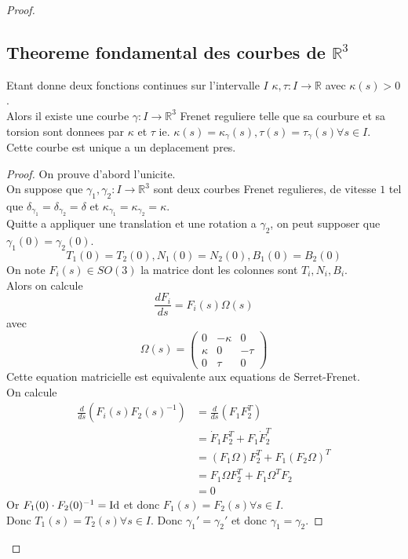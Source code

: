 \documentclass[../main.tex]{subfiles}
\begin{document}
\begin{proof}
\subsection{Theoreme fondamental des courbes de $ \mathbb{R}^{3}$ }
Etant donne deux fonctions continues sur l'intervalle $I$ $\kappa,\tau: I \to \mathbb{R}$ avec $\kappa( s) >0$.\\
Alors il existe une courbe $\gamma: I \to \mathbb{R}^{3}$ Frenet reguliere telle que sa courbure et sa torsion sont donnees par $\kappa$ et $\tau$ ie. $\kappa( s) = \kappa_\gamma( s) , \tau( s) = \tau_\gamma( s) \forall s \in I$.\\
Cette courbe est unique a un deplacement pres.		
\begin{proof}
On prouve d'abord l'unicite.\\
On suppose que $\gamma_1,\gamma_{2}: I \to \mathbb{R}^{3}$ 
sont deux courbes Frenet regulieres, de vitesse $1$ tel que $\delta_{\gamma_1} = \delta_{\gamma_2} =\delta$ et $\kappa_{\gamma_1} =\kappa_{\gamma_2} = \kappa$.\\
\hr
Quitte a appliquer une translation et une rotation a $\gamma_2$, on peut supposer que $\gamma_1( 0) =\gamma_2( 0) $.\\
\[ 
	T_1( 0) =T_2( 0) , N_1( 0) = N_2( 0) , B_1( 0) =B_2( 0) 
\]
On note $F_i( s) \in SO( 3) $ la matrice dont les colonnes sont $T_i, N_i, B_i$.\\
Alors on calcule
\[ 
	\frac{dF_i}{ds}=F_i( s) \Omega( s) 
\]
avec
\[ 
	\Omega( s) = 
	\begin{pmatrix}
		0 & - \kappa & 0\\
		\kappa & 0 & -\tau\\
		0 & \tau & 0
	\end{pmatrix} 
\]
Cette equation matricielle est equivalente aux equations de Serret-Frenet.\\
On calcule
\begin{align*}
	\frac{d}{ds}( F_i( s) F_2( s)^{-1}) &= \frac{d}{ds}( F_1 F_2^{T}) \\
					    &= \dot F_1 F_2^{T} +F_1\dot F_2^{T}\\
					    &= ( F_1\Omega) F_2^{T}+ F_1 ( F_2\Omega) ^{T}\\
					    &= F_1 \Omega F_2^{T}+ F_1 \Omega^{T}F_2\\
					    &= 0
\end{align*}
Or $F_1( 0) \cdot F_2( 0) ^{-1}=\operatorname{Id}$ et donc $F_1( s) = F_2( s) \forall s \in I$.\\
Donc $T_1( s) = T_2( s) \forall s \in I$.
Donc $\gamma_1'= \gamma_2'$ et donc $\gamma_1=\gamma_2$.

\end{proof}
\end{proof}
\end{document}

